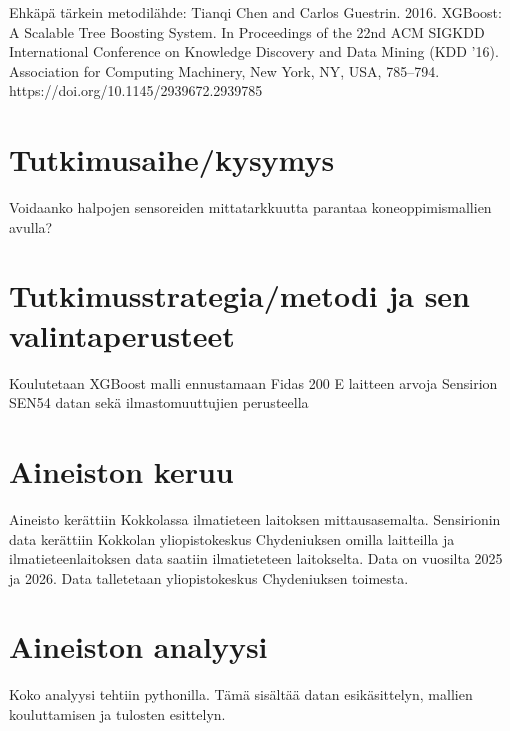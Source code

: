 \documentclass[utf8]{gradu3}
\begin{document}
Ehkäpä tärkein metodilähde:
Tianqi Chen and Carlos Guestrin. 2016. XGBoost: A Scalable Tree Boosting System. In Proceedings of the 22nd ACM SIGKDD International Conference on Knowledge Discovery and Data Mining (KDD '16). Association for Computing Machinery, New York, NY, USA, 785–794. https://doi.org/10.1145/2939672.2939785

\chapter{Tutkimusaihe/kysymys}

Voidaanko halpojen sensoreiden mittatarkkuutta parantaa koneoppimismallien avulla?

\chapter{Tutkimusstrategia/metodi ja sen valintaperusteet}

Koulutetaan XGBoost malli ennustamaan Fidas 200 E laitteen arvoja Sensirion SEN54 datan sekä ilmastomuuttujien perusteella

\chapter{Aineiston keruu}

Aineisto kerättiin Kokkolassa ilmatieteen laitoksen mittausasemalta. Sensirionin data kerättiin Kokkolan yliopistokeskus Chydeniuksen omilla laitteilla ja ilmatieteenlaitoksen data saatiin ilmatieteteen laitokselta. Data on vuosilta 2025 ja 2026. Data talletetaan yliopistokeskus Chydeniuksen toimesta.

\chapter{Aineiston analyysi}

Koko analyysi tehtiin pythonilla. Tämä sisältää datan esikäsittelyn, mallien kouluttamisen ja tulosten esittelyn.

\printbibliography
\end{document}
